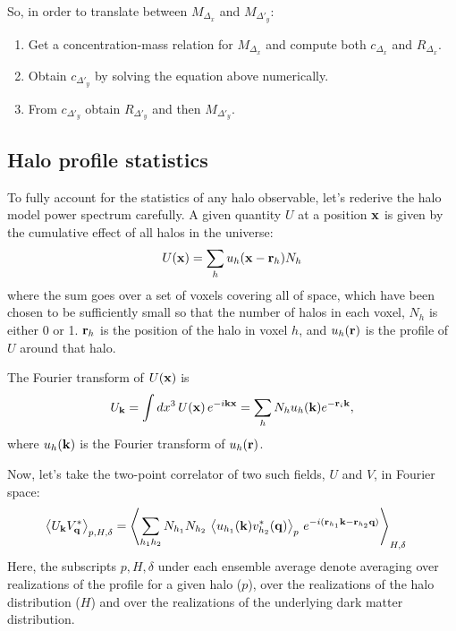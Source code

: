 \documentclass{article}
\begin{document}
So, in order to translate between $M_{\Delta_x}$ and $M_{\Delta'_y}$:
\begin{enumerate}
\item Get a concentration-mass relation for $M_{\Delta_x}$ and compute both $c_{\Delta_x}$ and $R_{\Delta_x}$.
\item Obtain $c_{\Delta'_y}$ by solving the equation above numerically.
\item From $c_{\Delta'_y}$ obtain $R_{\Delta'_y}$ and then $M_{\Delta'_y}$.
\end{enumerate}

\subsection{Halo profile statistics}
To fully account for the statistics of any halo observable, let's rederive the halo model power spectrum carefully. A given quantity $U$ at a position ${\bf x}$ is given by the cumulative effect of all halos in the universe:
\begin{equation}
  U({\bf x})=\sum_h u_h({\bf x}-{\bf r}_h)N_h
\end{equation}
where the sum goes over a set of voxels covering all of space, which have been chosen to be sufficiently small so that the number of halos in each voxel, $N_h$ is either 0 or 1. ${\bf r}_h$ is the position of the halo in voxel $h$, and $u_h({\bf r})$ is the profile of $U$ around that halo.

The Fourier transform of $U({\bf x})$ is
\begin{align}\nonumber
  U_{\bf k}=\int dx^3\,U({\bf x})\,e^{-i{\bf k}{\bf x}}=\sum_h N_h u_h({\bf k}) e^{-{\bf r}_i{\bf k}},
\end{align}
where $u_h({\bf k})$ is the Fourier transform of $u_h({\bf r})$.

Now, let's take the two-point correlator of two such fields, $U$ and $V$, in Fourier space:
\begin{align}
  \left\langle U_{\bf k}V^*_{\bf q}\right\rangle_{p,H,\delta}&=\left\langle\sum_{h_1h_2}N_{h_1}N_{h_2}\,\left\langle u_{h_1}({\bf k})v^*_{h_2}({\bf q})\right\rangle_p\,e^{-i({\bf r}_{h_1}{\bf k}-{\bf r}_{h_2}{\bf q})}\right\rangle_{H,\delta}
\end{align}
Here, the subscripts $p,H,\delta$ under each ensemble average denote averaging over realizations of the profile for a given halo ($p$), over the realizations of the halo distribution ($H$) and over the realizations of the underlying dark matter distribution.
\end{document}
